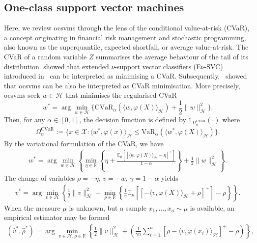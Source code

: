 \documentclass[twoside,11pt]{article}
\numberwithin{equation}{section}
\numberwithin{theorem}{section}
\newcommand{\R}{\mathbb{R}}
\newcommand{\X}{\mathcal{X}}
\newcommand{\ex}{\mathbb{E}}
\newcommand{\h}{\mathcal{H}}
\begin{document}
\subsection{One-class support vector machines}\label{sec:ocsvm_appendix}

Here, we review \glspl{ocsvm} through the lens of the conditional value-at-risk (CVaR), a concept originating in financial risk management and stochastic programming, also known as the superquantile, expected shortfall, or average value-at-risk. The CVaR of a random variable $Z$ summarises the average behaviour of the tail of its distribution. \cite{takeda2008nu} showed that extended $\nu$-support vector classifiers (E$\nu$-SVC) introduced in~\citep{perez2003extension} can be interpreted as minimising a CVaR. Subsequently,~\cite{tsyurmasto2014value} showed that \glspl{ocsvm} can be also be interpreted as CVaR minimisation. More precisely, \glspl{ocsvm} seek $w\in\h$ that minimises the regularised CVaR
$$
w^*=\arg\min_{w\in \h} \bigg\{\mathrm{CVaR}_{\alpha}(\langle w, \varphi(X)\rangle_\h)+\frac{1}{2} \|w\|^2_{\h}\bigg\}.
$$
Then, for any $\alpha \in [0,1]$, the decision function is defined by $\mathds{1}_{\Omega^{\mathrm{CVaR}}_{\alpha}}(\cdot)$ where 
\begin{align}\label{eq:region_cvar}
\Omega^{\mathrm{CVaR}}_\alpha := \{x\in\X:\langle w^*, \varphi(x)\rangle_\h\leq \text{VaR}_\alpha(\langle w^*, \varphi(X)\rangle_\h)\}. 
\end{align}
By the variational formulation of the CVaR, we have
\begin{align*}
w^* = \arg\min_{w\in \h}\left\{
 \min_{\eta\in \R}
\left\{
\eta + \frac{\ex_\mu[[\langle w,\varphi(X)\rangle_\h-\eta]^+]}{1-\alpha}\right\}
+ \frac{1}{2}\|w\|_{\h}^2
\right\}.
\end{align*}
The change of variables $\rho=-\eta$, $v=-w$, $\gamma=1-\alpha$ yields
\begin{align*}
v^* = \arg\min_{v\in \h}
\left\{
\frac{1}{2}\|v\|_{\h}^2
+\min_{\rho\in \R}
\left\{
\frac{1}{\gamma} \ex_\mu[[-\langle v,\varphi(X)\rangle_\h+\rho]^+] -\rho\right\}
\right\}.
\end{align*}
When the measure $\mu$ is unknown, but a sample $x_1, \ldots, x_n\sim\mu$ is available, an empirical estimator \citep{wang2014robust} may be formed 
\begin{align}\label{eq:ocsvm_unconstrained}
(\hat{v}^*, \hat{\rho}^*)=\arg\min_{v\in \h,\rho\in \R} 
\left\{
\frac{1}{2}\|v\|_{\h}^2
+\left(
\frac{1}{\gamma n}\sum_{i=1}^{n}[\rho-\langle v, \varphi(x_i)\rangle_\h]^+ -\rho
\right)
\right\},
\end{align}
\end{document}
